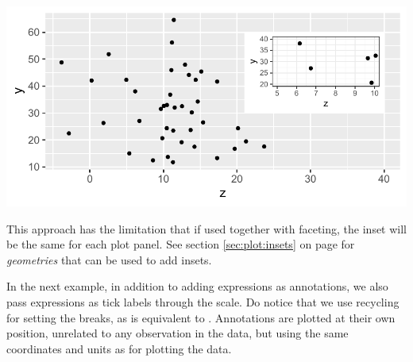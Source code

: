\documentclass[krantz2]{krantz}\usepackage{knitr}
\begin{document}
\begin{knitrout}\footnotesize
{}\color{fgcolor}\begin{kframe}
\begin{alltt}
 \hlkwb{<-}   \hlopt{+}
  \hlstd{()}
 \hlopt{+} \hlstd{(} \hlstd{=} \hlstd{)} \hlopt{+}
  \hlstd{(} \hlopt{+} \hlstd{(} \hlstd{=} \hlstd{(}\hlstd{,} \hlstd{),}  \hlstd{=} \hlstd{(}\hlstd{,} \hlstd{))} \hlopt{+}
                               \hlstd{(}\hlstd{)),}
                     \hlstd{=} \hlstd{,}  \hlstd{=} \hlstd{,}  \hlstd{=} \hlstd{,}  \hlstd{=} \hlstd{)}
\end{alltt}
\end{kframe}

{\centering \includegraphics[width=.7\textwidth]{figure/pos-inset-01-1} 

}



\end{knitrout}

This approach has the limitation that if used together with faceting, the inset will be the same for each plot panel. See section \ref{sec:plot:insets} on page \pageref{sec:plot:insets} for \emph{geometries} that can be used to add insets.

In the next example, in addition to adding expressions as annotations, we also pass expressions as tick labels through the scale. Do notice that we use recycling for setting the breaks, as  is equivalent to . Annotations are plotted at their own position, unrelated to any observation in the data, but using the same coordinates and units as for plotting the data.
\end{document}
